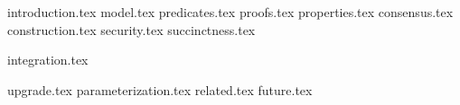 {introduction.tex}
{model.tex}
{predicates.tex}
{proofs.tex}
{properties.tex}
{consensus.tex}
{construction.tex}
{security.tex}
{succinctness.tex}

{integration.tex}

{upgrade.tex}
{parameterization.tex}
{related.tex}
{future.tex}

